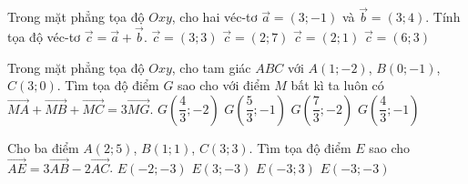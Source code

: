 \begin{ex}%
	Trong mặt phẳng tọa độ $Oxy$, cho hai véc-tơ $\overrightarrow{a}=(3;-1)$ và $\overrightarrow{b}=(3;4)$. Tính tọa độ véc-tơ $\overrightarrow{c}=\overrightarrow{a}+\overrightarrow{b}$.
	\choice
	{$\overrightarrow{c}=(3;3)$}
	{$\overrightarrow{c}=(2;7)$}
	{$\overrightarrow{c}=(2;1)$}
	{\True $\overrightarrow{c}=(6;3)$}
\end{ex}
\begin{ex}%
	Trong mặt phẳng tọa độ $Oxy$, cho tam giác $ABC$ với $A(1;-2)$, $B(0;-1)$, $C(3;0)$. Tìm tọa độ điểm $G$ sao cho với điểm $M$ bất kì ta luôn có $\overrightarrow{MA}+\overrightarrow{MB}+\overrightarrow{MC}=3\overrightarrow{MG}$.
	\choice
	{$G\left(\dfrac{4}{3};-2\right)$}
	{$G\left(\dfrac{5}{3};-1\right)$}
	{$G\left(\dfrac{7}{3};-2\right)$}
	{\True $G\left(\dfrac{4}{3};-1\right)$}
\end{ex}
\begin{ex}%
	Cho ba điểm $A(2;5)$, $B(1;1)$, $C(3;3)$. Tìm tọa độ điểm $E$ sao cho $\overrightarrow{AE} = 3\overrightarrow{AB} - 2\overrightarrow{AC}$.
	\choice
	{$E(-2;-3)$}
	{$E(3;-3)$}
	{$E(-3;3)$}
	{\True $E(-3;-3)$}
\end{ex}
